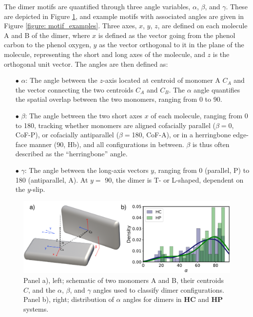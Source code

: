 The dimer motifs are quantified through three angle variables, $\alpha$, $\beta$, and $\gamma$. These are depicted in Figure \ref{figure: dimer_schematic_alpha}, and example motifs with associated angles are given in Figure \ref{figure: motif_examples}. Three axes, $x$, $y$, $z$, are defined on each molecule A and B of the dimer, where $x$ is defined as the vector going from the phenol carbon to the phenol oxygen, $y$ as the vector orthogonal to it in the plane of the molecule, representing the short and long axes of the molecule, and $z$ is the orthogonal unit vector. The angles are then defined as:
\begin{itemize}
\item[$\bullet$] $\alpha$: The angle between the $z$-axis located at centroid of monomer A $C_{A}$ and the vector connecting the two centroids $C_{A}$ and $C_{B}$.  The $\alpha$ angle quantifies the spatial overlap between the two monomers, ranging from 0\degree{} to 90\degree{}. 

\item[$\bullet$] $\beta$: The angle between the two short axes $x$ of each molecule, ranging from 0\degree{} to 180\degree{}, tracking whether monomers are aligned cofacially parallel ($\beta=$0\degree{}, CoF-P), or cofacially antiparallel ($\beta=$180\degree{}, CoF-A), or in a herringbone edge-face manner (90\degree{}, Hb), and all configurations in between. $\beta$ is thus often described as the ``herringbone'' angle. 

\item[$\bullet$] $\gamma$: The angle between the long-axis vectors $y$, ranging from 0\degree{} (parallel, P) to 180\degree{} (antiparallel, A). At $y=$ 90\degree{}, the dimer is T- or L-shaped, dependent on the $y$-slip. 
\end{itemize}
\begin{figure}[H]
\centering
  \includegraphics[width=0.8\linewidth]{5ConnectingCrystalStructure/dimer_schematic_alpha}
  \caption[Schematic of $\alpha$, $\beta$, and $\gamma$ angles for classification of dimers.]{Panel a), left; schematic of two monomers A and B, their centroids $C$, and the $\alpha$, $\beta$, and $\gamma$ angles used to classify dimer configurations. Panel b), right; distribution of $\alpha$ angles for dimers in \textbf{HC} and \textbf{HP} systems.}
  \label{figure: dimer_schematic_alpha}
\end{figure}

